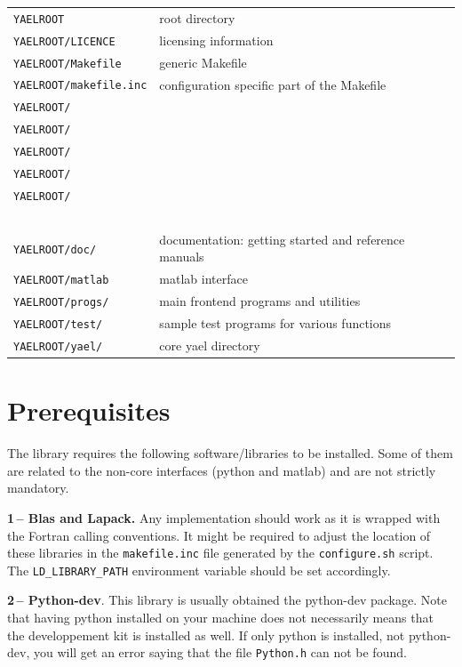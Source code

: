 \documentclass[a4paper,11pt,notitlepage,final,twoside]{report}
\newcommand{\yroot}{\texttt{YAELROOT}\xspace}
\begin{document}
\begin{tabular}{ll}
\yroot                   & root directory \\
\texttt{\yroot/LICENCE}  & licensing information \\
\texttt{\yroot/Makefile} & generic Makefile \\
\texttt{\yroot/makefile.inc}  & configuration specific part of the Makefile\\
\texttt{\yroot/}  & \\
\texttt{\yroot/}  & \\
\texttt{\yroot/}  & \\
\texttt{\yroot/}  & \\
\texttt{\yroot/}  & \\
~\\
\texttt{\yroot/doc/}     & documentation: getting started and reference manuals \\
\texttt{\yroot/matlab}   & matlab interface \\
\texttt{\yroot/progs/}   & main frontend programs and utilities \\
\texttt{\yroot/test/}    & sample test programs for various functions \\
\texttt{\yroot/yael/}    & core yael directory  \\
\end{tabular}


\section{Prerequisites}

The library requires the following software/libraries to be installed. 
Some of them are related to the non-core interfaces (python and matlab) 
and are not strictly mandatory. 
\bigskip

{\bf 1\,-- Blas and Lapack. } 
Any implementation should work as it is
wrapped with the Fortran calling conventions. 
It might be required to adjust the location of these libraries in 
the \texttt{makefile.inc} file generated by the \texttt{configure.sh} script. 
The \texttt{LD\_LIBRARY\_PATH} environment variable should be set accordingly. 
\bigskip

{\bf 2\,-- Python-dev}. 
This library is usually obtained the python-dev package. 
Note that having python installed on your machine does not necessarily 
means that the developpement kit is installed as well. 
If only python is installed, not python-dev, you will get an error 
saying that the file \texttt{Python.h} can not be found. 
\bigskip
\end{document}
